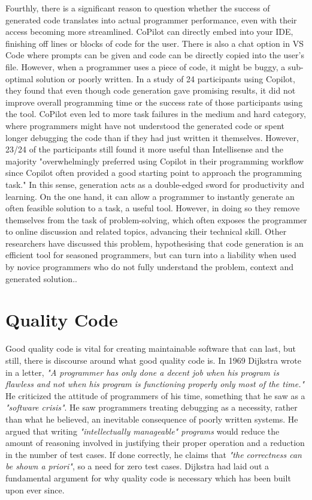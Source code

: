 \documentclass[manuscript,screen,review,sigconf]{acmart}
\begin{document}
Fourthly, there is a significant reason to question whether the success of generated code translates into actual programmer performance, even with their access becoming more streamlined. CoPilot can directly embed into your IDE, finishing off lines or blocks of code for the user. There is also a chat option in VS Code where prompts can be given and code can be directly copied into the user's file. However, when a programmer uses a piece of code, it might be buggy, a sub-optimal solution or poorly written. In a study of 24 participants using Copilot\cite{Expectation_vs_Experience}, they found that even though code generation gave promising results, it did not improve overall programming time or the success rate of those participants using the tool. CoPilot even led to more task failures in the medium and hard category, where programmers might have not understood the generated code or spent longer debugging the code than if they had just written it themselves. However, 23/24 of the participants still found it more useful than Intellisense and the majority "overwhelmingly preferred using Copilot in their programming workflow since Copilot often provided a good starting point to approach the programming task." In this sense, generation acts as a double-edged sword for productivity and learning. On the one hand, it can allow a programmer to instantly generate an often feasible solution to a task, a useful tool. However, in doing so they remove themselves from the task of problem-solving, which often exposes the programmer to online discussion and related topics, advancing their technical skill. Other researchers have discussed this problem, hypothesising that code generation is an efficient tool for seasoned programmers, but can turn into a liability when used by novice programmers who do not fully understand the problem, context and generated solution.\cite{CopilotPairProgrammer}.

\section{Quality Code}
Good quality code is vital for creating maintainable software that can last, but still, there is discourse around what good quality code is. In 1969 Dijkstra wrote in a letter, \textit{"A programmer has only done a decent job when his program is flawless and not when his program is functioning properly only most of the time."} He criticized the attitude of programmers of his time, something that he saw as a \textit{"software crisis"}. He saw programmers treating debugging as a necessity, rather than what he believed, an inevitable consequence of poorly written systems. He argued that writing \textit{"intellectually manageable" programs} would reduce the amount of reasoning involved in justifying their proper operation and a reduction in the number of test cases. If done correctly, he claims that \textit{"the correctness can be shown a priori"}, so a need for zero test cases. Dijkstra had laid out a fundamental argument for why quality code is necessary which has been built upon ever since\cite{EWD:EWD288}.
\end{document}
